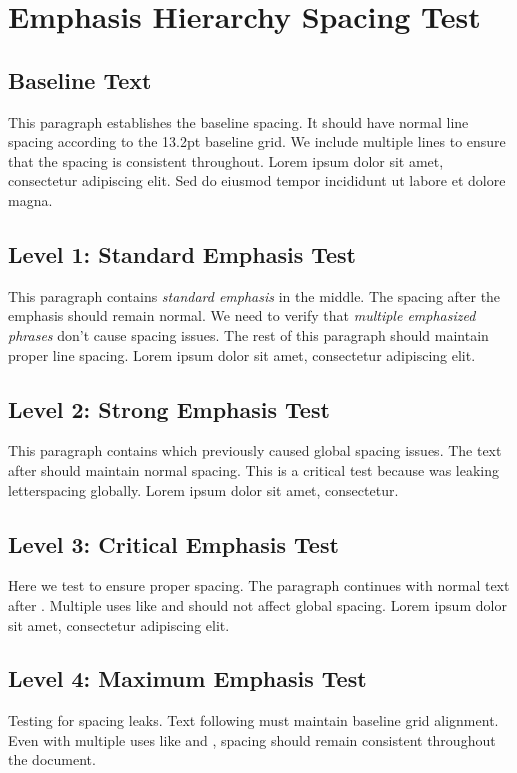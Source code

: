 \documentclass[11pt]{article}
\begin{document}
\section{Emphasis Hierarchy Spacing Test}

\subsection{Baseline Text}
This paragraph establishes the baseline spacing. It should have normal line spacing
according to the 13.2pt baseline grid. We include multiple lines to ensure that
the spacing is consistent throughout. Lorem ipsum dolor sit amet, consectetur 
adipiscing elit. Sed do eiusmod tempor incididunt ut labore et dolore magna.

\subsection{Level 1: Standard Emphasis Test}
This paragraph contains \emph{standard emphasis} in the middle. The spacing after
the emphasis should remain normal. We need to verify that \emph{multiple emphasized
phrases} don't cause spacing issues. The rest of this paragraph should maintain
proper line spacing. Lorem ipsum dolor sit amet, consectetur adipiscing elit.

\subsection{Level 2: Strong Emphasis Test}
\label{sec:strong-emphasis-critical}
This paragraph contains  which previously caused global
spacing issues. The text after  should maintain
normal spacing. This is a critical test because 
was leaking letterspacing globally. Lorem ipsum dolor sit amet, consectetur.

\subsection{Level 3: Critical Emphasis Test}
Here we test  to ensure proper spacing. The paragraph
continues with normal text after . Multiple
uses like  and  should not affect
global spacing. Lorem ipsum dolor sit amet, consectetur adipiscing elit.

\subsection{Level 4: Maximum Emphasis Test}
Testing  for spacing leaks. Text following  must maintain baseline grid alignment. Even with multiple uses
like  and , spacing should
remain consistent throughout the document.
\end{document}
